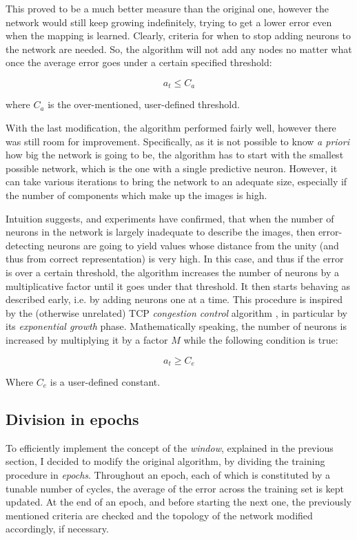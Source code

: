 \documentclass[11pt,a4paper]{report}
\begin{document}
				This proved to be a much better measure than the original one, however the network would still keep growing indefinitely, trying to get a lower error even when the mapping is learned. Clearly, criteria for when to stop adding neurons to the network are needed. So, the algorithm will not add any nodes no matter what once the average error goes under a certain specified threshold:
				
				\begin{equation}
					a_t \leq C_a
				\end{equation}
				
				where $C_a$ is the over-mentioned, user-defined threshold.
				
				With the last modification, the algorithm performed fairly well, however there was still room for improvement. Specifically, as it is not possible to know \emph{a priori} how big the network is going to be, the algorithm has to start with the smallest possible network, which is the one with a single predictive neuron. However, it can take various iterations to bring the network to an adequate size, especially if the number of components which make up the images is high.
				
				Intuition suggests, and experiments have confirmed, that when the number of neurons in the network is largely inadequate to describe the images, then error-detecting neurons are going to yield values whose distance from the unity (and thus from correct representation) is very high. In this case, and thus if the error is over a certain threshold, the algorithm increases the number of neurons by a multiplicative factor until it goes under that threshold. It then starts behaving as described early, i.e. by adding neurons one at a time. This procedure is inspired by the (otherwise unrelated) TCP \emph{congestion control} algorithm \cite{allman2009tcp}, in particular by its \emph{{exponential growth}} phase. Mathematically speaking, the number of neurons is increased by multiplying it by a factor $M$ while the following condition is true:
				
				\begin{equation}
					a_t \geq C_e
				\end{equation}
				
				Where $C_e$ is a user-defined constant.
				
			\subsection{Division in epochs}
				\label{sec:epochs}
				To efficiently implement the concept of the \emph{window}, explained in the previous section, I decided to modify the original algorithm, by dividing the training procedure in \emph{epochs}. Throughout an epoch, each of which is constituted by a tunable number of cycles, the average of the error across the training set is kept updated. At the end of an epoch, and before starting the next one, the previously mentioned criteria are checked and the topology of the network modified accordingly, if necessary.
			
\end{document}
